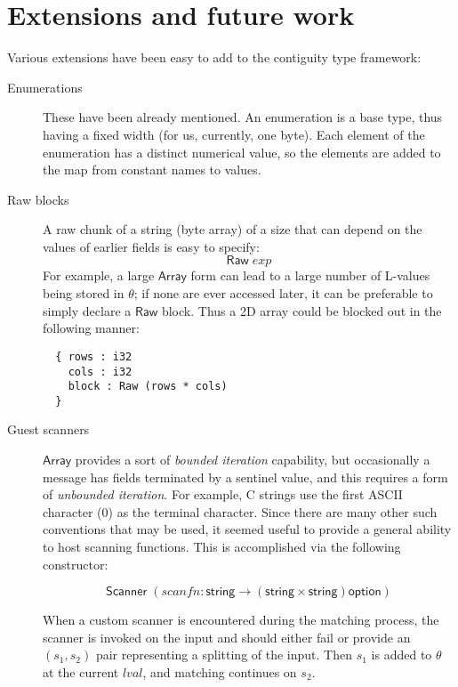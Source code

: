 \documentclass[sigplan,10pt,anonymous,review]{acmart}\settopmatter{printfolios=true,printccs=false,printacmref=false}
\newcommand{\konst}[1]{\ensuremath{\mathsf{#1}}}
\newcommand{\lval}{\ensuremath{\mathit{lval}}}
\begin{document}
\section{Extensions and future work}

Various extensions have been easy to add to the contiguity type
framework:

\begin{description}

\item [Enumerations] These have been already mentioned. An enumeration
  is a base type, thus having a fixed width (for us, currently, one
  byte). Each element of the enumeration has a distinct numerical
  value, so the elements are added to the map from constant names to values.

\item [Raw blocks] A raw chunk of a string (byte array) of a size that
  can depend on the values of earlier fields is easy to specify:
  \[ \konst{Raw}\; \mathit{exp} \]
For example, a large \konst{Array} form can lead to a large number of
L-values being stored in $\theta$; if none are ever accessed later, it
can be preferable to simply declare a \konst{Raw} block. Thus a 2D
array could be blocked out in the following manner:

\begin{verbatim}
  { rows : i32
    cols : i32
    block : Raw (rows * cols)
  }
\end{verbatim}

\item [Guest scanners] \konst{Array} provides a sort of \emph{bounded
  iteration} capability, but occasionally a message has fields
  terminated by a sentinel value, and this requires a form of
  \emph{unbounded iteration}. For example, C strings use the first
  ASCII character (0) as the terminal character. Since there are many
  other such conventions that may be used, it seemed useful to provide
  a general ability to host scanning functions. This is accomplished via the following constructor:

  \[ \konst{Scanner}\;
     (\mathit{scanfn} : \konst{string} \to (\konst{string} \times \konst{string})\konst{option}) \]

  When a custom scanner is encountered during the matching process,
  the scanner is invoked on the input and should either fail or
  provide an $(s_1,s_2)$ pair representing a splitting of the
  input. Then $s_1$ is added to $\theta$ at the current \lval, and
  matching continues on $s_2$.


\end{description}
\end{document}
